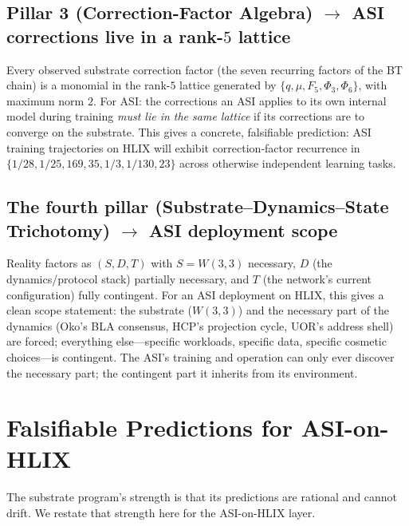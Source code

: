 \documentclass[11pt,letterpaper]{article}
\theoremstyle{remark}
\newcommand{\W}{W(3,3)}
\begin{document}
\subsection{Pillar 3 (Correction-Factor Algebra) $\to$ ASI corrections live in a rank-$5$ lattice}
Every observed substrate correction factor (the seven recurring factors of the BT chain) is
a monomial in the rank-$5$ lattice generated by $\{q,\mu,F_5,\Phi_3,\Phi_6\}$, with maximum
norm $2$. For ASI: the corrections an ASI applies to its own internal model during training
\emph{must lie in the same lattice} if its corrections are to converge on the substrate.
This gives a concrete, falsifiable prediction: ASI training trajectories on HLIX will
exhibit correction-factor recurrence in $\{1/28, 1/25, 169, 35, 1/3, 1/130, 23\}$ across
otherwise independent learning tasks.

\subsection{The fourth pillar (Substrate--Dynamics--State Trichotomy) $\to$ ASI deployment scope}
Reality factors as $(S,D,T)$ with $S=\W$ necessary, $D$ (the dynamics/protocol stack)
partially necessary, and $T$ (the network's current configuration) fully contingent. For an
ASI deployment on HLIX, this gives a clean scope statement: the substrate ($\W$) and the
necessary part of the dynamics (Oko's BLA consensus, HCP's projection cycle, UOR's address
shell) are forced; everything else---specific workloads, specific data, specific cosmetic
choices---is contingent. The ASI's training and operation can only ever discover the
necessary part; the contingent part it inherits from its environment.

\section{Falsifiable Predictions for ASI-on-HLIX}

The substrate program's strength is that its predictions are rational and cannot drift. We
restate that strength here for the ASI-on-HLIX layer.
\end{document}
